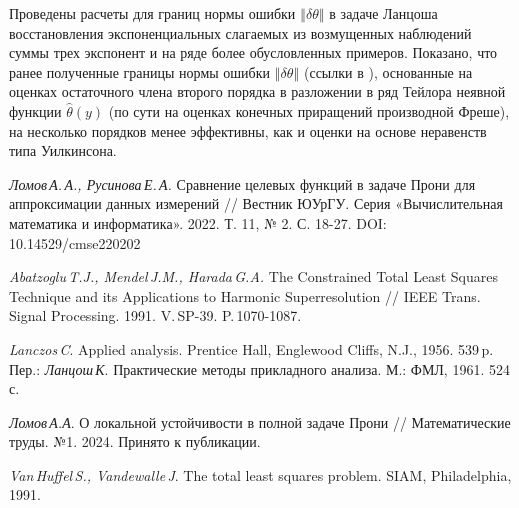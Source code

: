 Проведены расчеты для границ нормы ошибки
$\left\Vert \delta\theta\right\Vert $
в задаче Ланцоша восстановления экспоненциальных слагаемых из возмущенных наблюдений суммы трех экспонент \cite{Lanczos-1956} и на ряде более обусловленных примеров. Показано, что ранее полученные границы нормы
ошибки $\left\Vert \delta\theta\right\Vert $ (ссылки в \cite{Lomov--Rusinova-2022,Lomov-2024-MTrudy}),
основанные на оценках остаточного члена второго порядка в разложении в ряд Тейлора неявной функции $\hat{\theta}(y)$ (по сути на оценках конечных приращений производной Фреше), на несколько порядков менее эффективны, как и оценки на основе неравенств типа Уилкинсона.

%



\begin{thebibliography}{9} %
\emph{Ломов\,А.\,А., Русинова\,Е.\,А.}
Сравнение целевых функций в задаче Прони для аппроксимации данных
измерений // Вестник ЮУрГУ. Серия «Вычислительная математика и информатика».
2022. Т. 11, № 2. С. 18-27. DOI: 10.14529/cmse220202

\emph{Abatzoglu\,T.J., Mendel\,J.M.,
Harada\,G.A.} The Constrained Total Least Squares Technique and its
Applications to Harmonic Superresolution // IEEE Trans. Signal Processing.
1991. V.\,SP-39. P.\emph{\,}1070-1087.

\emph{Lanczos\,C}. Applied analysis. Prentice
Hall, Englewood Cliffs, N.J., 1956. 539\,p. Пер.: \emph{Ланцош\,К}.
Практические методы прикладного анализа. М.: ФМЛ, 1961. 524\,с.

\emph{Ломов\,А.А}. О локальной устойчивости
в полной задаче Прони // Математические труды. №1. 2024. Принято к
публикации.

\emph{Van\,Huffel\,S., Vandewalle\,J}.
The total least squares problem. SIAM, Philadelphia, 1991.

\end{thebibliography}







%


